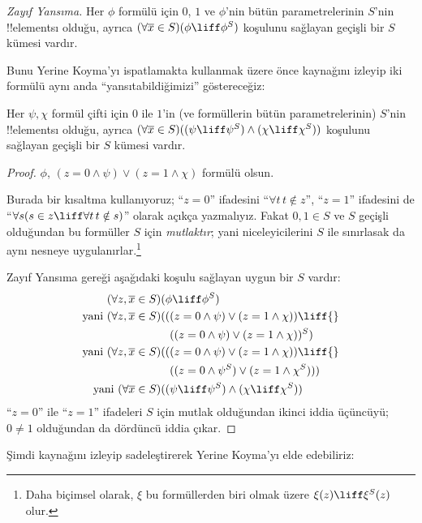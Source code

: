 \begin{defish}
\emph{Zayıf Yansıma.} Her $\phi$ formülü için $0$, $1$ ve $\phi$'nin bütün
parametrelerinin $S$'nin !!{element}s{}ı olduğu, ayrıca $(\forall \overline{x}
\in S)(\phi \liff \phi^S)$ koşulunu sağlayan geçişli bir $S$ kümesi vardır.
\end{defish}

Bunu Yerine Koyma'yı ispatlamakta kullanmak üzere önce \citet[Theorem 2'nin
ilk kısmı]{Levy1960} kaynağını izleyip iki formülü aynı anda
``yansıtabildiğimizi'' göstereceğiz:

\begin{lem}
Her $\psi, \chi$ formül çifti için $0$ ile $1$'in (ve formüllerin bütün
parametrelerinin) $S$'nin !!{element}s{}ı olduğu, ayrıca $(\forall \overline{x}
\in S)((\psi \liff \psi^S) \land (\chi \liff \chi^S))$ koşulunu sağlayan
geçişli bir $S$ kümesi vardır.
\end{lem}

\begin{proof}
$\phi$, $(z = 0 \land \psi) \lor (z = 1 \land \chi)$ formülü olsun.

Burada bir kısaltma kullanıyoruz; ``$z = 0$'' ifadesini ``$\forall t\, t
\notin z$'', ``$z =1$'' ifadesini de ``$\forall s(s \in z \liff \forall
t\, t \notin s)$'' olarak açıkça yazmalıyız. Fakat $0, 1 \in S$ ve $S$
geçişli olduğundan bu formüller $S$ için \emph{mutlaktır}; yani
niceleyicilerini $S$ ile sınırlasak da aynı nesneye uygulanırlar.\footnote{Daha
biçimsel olarak, $\xi$ bu formüllerden biri olmak üzere $\xi(z) \liff
\xi^S(z)$ olur.}

Zayıf Yansıma gereği aşağıdaki koşulu sağlayan uygun bir $S$ vardır:
\begin{align*}
	(\forall z, \overline{x} \in S)(&\phi \liff \phi^S)\\
	\text{yani }(\forall z, \overline{x} \in S)(&((z = 0 \land \psi) \lor (z = 1 \land \chi)) \liff {}\\
	&\phantom{(}((z = 0 \land \psi) \lor (z = 1 \land \chi))^S)\\
	\text{yani }(\forall z, \overline{x} \in S)(&((z = 0 \land \psi) \lor (z = 1 \land \chi))\liff {}\\
	&\phantom{(}((z = 0 \land \psi^S) \lor (z = 1 \land \chi^S)))\\
	\text{yani }(\forall \overline{x} \in S)(&(\psi \liff \psi^S) \land (\chi \liff \chi^S))
\end{align*}
``$z = 0$'' ile ``$z=1$'' ifadeleri $S$ için mutlak olduğundan ikinci iddia
üçüncüyü; $0 \neq 1$ olduğundan da dördüncü iddia çıkar.
\end{proof}\noindent
Şimdi \citet[Theorem 6]{Levy1960} kaynağını izleyip sadeleştirerek Yerine
Koyma'yı elde edebiliriz:

